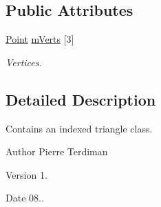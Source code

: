 \subsection*{Public Attributes}
\begin{DoxyCompactItemize}
\item 
\hypertarget{class_triangle_a08015a93222f99844caad6aa1bacc990}{\hyperlink{class_point}{Point} \hyperlink{class_triangle_a08015a93222f99844caad6aa1bacc990}{m\+Verts} \mbox{[}3\mbox{]}}\label{class_triangle_a08015a93222f99844caad6aa1bacc990}

\begin{DoxyCompactList}\small\item\em Vertices. \end{DoxyCompactList}\end{DoxyCompactItemize}


\subsection{Detailed Description}
Contains an indexed triangle class.

\begin{DoxyAuthor}{Author}
Pierre Terdiman 
\end{DoxyAuthor}
\begin{DoxyVersion}{Version}
1. 
\end{DoxyVersion}
\begin{DoxyDate}{Date}
08.. 
\end{DoxyDate}


